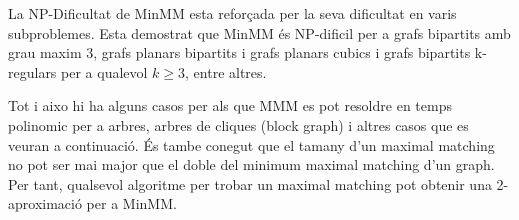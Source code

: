 La NP-Dificultat de MinMM esta reforçada per la seva dificultat en varis subproblemes. Esta demostrat que MinMM és NP-dificil per a grafs bipartits amb grau maxim 3, grafs planars bipartits i grafs planars cubics i grafs bipartits k-regulars per a qualevol $k \ge 3$, entre altres.

Tot i aixo hi ha alguns casos per als que MMM es pot resoldre en temps polinomic per a arbres, arbres de cliques (block graph) i altres casos que es veuran a continuació.
És tambe conegut que el tamany d'un maximal matching no pot ser mai major que el doble del minimum maximal matching d'un graph. Per tant, qualsevol algoritme per trobar un maximal matching pot obtenir una 2-aproximació per a MinMM.
